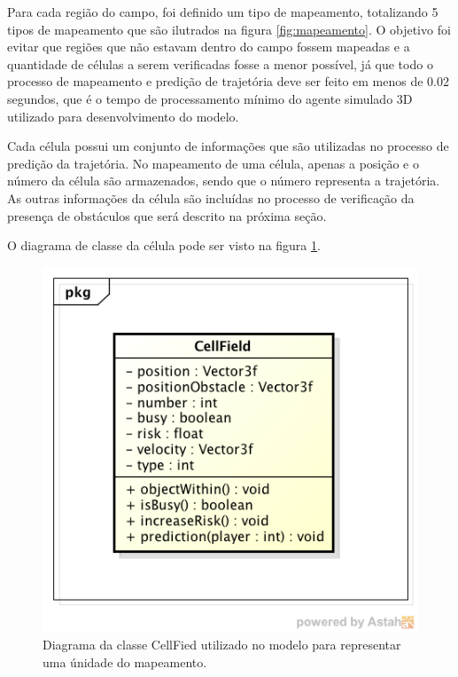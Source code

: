 Para cada região do campo, foi definido um tipo de mapeamento, totalizando 5 tipos de mapeamento que são ilutrados na 
figura \ref{fig:mapeamento}. O objetivo foi evitar que regiões que não estavam dentro do campo fossem mapeadas e a quantidade
de células a serem verificadas fosse a menor possível, já que todo o processo de mapeamento e predição de trajetória deve ser 
feito em menos de $0.02$ segundos, que é o tempo de processamento mínimo do agente simulado 3D utilizado para desenvolvimento 
do modelo. 

Cada célula possui um conjunto de informações que são utilizadas no processo de predição da trajetória. No mapeamento de uma 
célula, apenas a posição e o número da célula são armazenados, sendo que o número representa a trajetória. As outras informações
da célula são incluídas no processo de verificação da presença de obstáculos que será descrito na próxima seção.

O diagrama de classe da célula pode ser visto na figura \ref{fig:celula}.

\begin{figure}[!htb]
\centering
\includegraphics[scale=0.8]{figuras/celula.png}
\caption{Diagrama da classe CellFied utilizado no modelo para representar uma únidade do mapeamento.}
\label{fig:celula}
\end{figure}
\FloatBarrier

